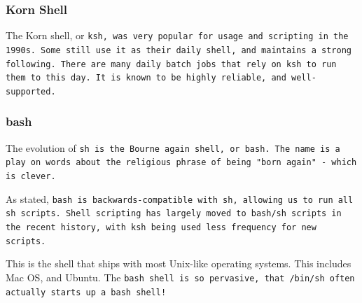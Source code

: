 \subsubsection{Korn Shell}
The Korn shell, or \tt{ksh}, was very popular for usage and scripting in the 1990s.
Some still use it as their daily shell, and maintains a strong following. There
are many daily batch jobs that rely on \tt{ksh} to run them to this day. It is known
to be highly reliable, and well-supported.

\subsubsection{bash}

The evolution of \tt{sh} is the Bourne again shell, or \tt{bash}. The name
is a play on words about the religious phrase of being "born again" - which
is clever.

As stated, \tt{bash} is backwards-compatible with \tt{sh}, allowing us to run
all \tt{sh} scripts. Shell scripting has largely moved to \tt{bash}/\tt{sh} scripts in the
recent history, with \tt{ksh} being used less frequency for new scripts.

This is the shell that ships with most Unix-like operating systems. This includes Mac OS,
and Ubuntu.
The \tt{bash} shell is so pervasive, that \tt{/bin/sh} often actually
starts up a \tt{bash} shell!




